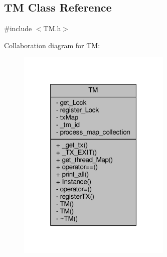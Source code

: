 \hypertarget{class_t_m}{}\subsection{TM Class Reference}
\label{class_t_m}


{\ttfamily \#include $<$T\+M.\+h$>$}



Collaboration diagram for TM\+:
\nopagebreak
\begin{figure}[H]
\begin{center}
\leavevmode
\includegraphics[width=208pt]{class_t_m__coll__graph}
\end{center}
\end{figure}
